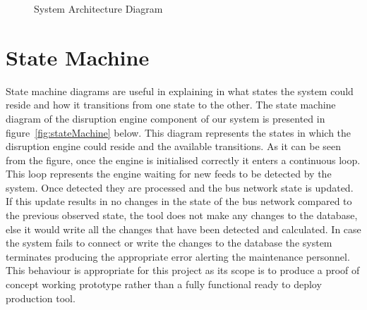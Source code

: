 \begin{figure}
	\caption{System Architecture Diagram}
\label{fig:systemArchitecture}
\end{figure}

\FloatBarrier
\section{State Machine}
State machine diagrams are useful in explaining in what states the system could reside and how it transitions from one state to the other. The state machine diagram of the disruption engine component of our system is presented in figure~\ref{fig:stateMachine} below. This diagram represents the states in which the disruption engine could reside and the available transitions. As it can be seen from the figure, once the engine is initialised correctly it enters a continuous loop. This loop represents the engine waiting for new feeds to be detected by the system. Once detected they are processed and the bus network state is updated. If this update results in no changes in the state of the bus network compared to the previous observed state, the tool does not make any changes to the database, else it would write all the changes that have been detected and calculated. In case the system fails to connect or write the changes to the database the system terminates producing the appropriate error alerting the maintenance personnel. This behaviour is appropriate for this project as its scope is to produce a proof of concept working prototype rather than a fully functional ready to deploy production tool.

